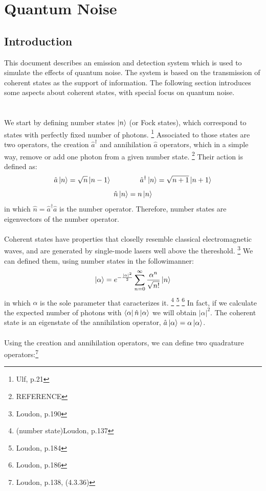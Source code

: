 \clearpage
\section{Quantum Noise}

\subsection*{Introduction}\label{sec:intro}


This document describes an emission and detection system which is used to simulate the effects of quantum noise. The system is based on the transmission of coherent states as the support of information. The following section introduces some aspects about coherent states, with special focus on quantum noise.\\
\\
\\
We start by defining number states $\ket{n}$ (or Fock states), which correspond to states with perfectly fixed number of photons.
\footnote{Ulf, p.21}
Associated to those states are two operators, the creation $\hat{a}^\dagger$ and annihilation $\hat{a}$ operators, which in a simple way, remove or add one photon from a given number state.
\footnote{REFERENCE}
Their action is defined as:
$$
\hat{a} \ket{n} = \sqrt{n} \ket{n-1} \qquad \qquad
\hat{a}^\dagger \ket{n} = \sqrt{n+1} \ket{n+1}
$$
$$
\hat{n} \ket{n} = n \ket{n}
$$
in which $\hat{n} = \hat{a}^\dagger\hat{a}$ is the number operator. Therefore, number states are eigenvectors of the number operator.\\
\\
Coherent states have properties that closelly resemble classical electromagnetic waves, and are generated by single-mode lasers well above the thereshold.
\footnote{Loudon, p.190}
We can defined them, using number states in the followi\ng manner:
$$
\ket{\alpha} = e^{-\frac{|\alpha|^2}{2}} \sum_{n=0}^\infty \frac{\alpha^n}{\sqrt{n!}} \ket{n}
$$
in which $\alpha$ is the sole parameter that caracterizes it.
\footnote{(number state)Loudon, p.137}
\footnote{Loudon, p.184}
\footnote{Loudon, p.186}
In fact, if we calculate the expected number of photons with $\bra{\alpha} \hat{n} \ket{\alpha}$ we will obtain $|\alpha|^2$. The coherent state is an eigenstate of the annihilation operator, $\hat{a}\ket{\alpha} = \alpha \ket{\alpha}$.\\
\\
%
%
Using the creation and annihilation operators, we can define two quadrature operators:\footnote{Loudon, p.138, (4.3.36)}

